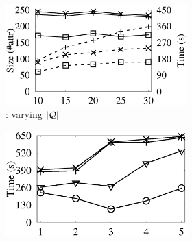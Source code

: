 \begin{figure}[tb!]
  \vspace*{-2.4ex}
  \begin{subfigure}[b]{1.00\textwidth}
    \setlength{\fboxrule}{0.1pt}
    \vspace{0.5ex}
  \end{subfigure}
\begin{subfigure}[b]{1.00\textwidth}
  \centering
        \begin{subfigure}[b]{0.271\textwidth}
			\centering
			\includegraphics[width=1\textwidth]{fig/vary_q_tpch.eps}
			\begin{center}
				\vspace{-2ex}\caption{\tpch: varying $|\mathcal Q|$}
				\label{tpch-1-varyQ}
			\end{center}
			\vspace{-1ex}
        \end{subfigure}
        \hspace{-3ex}
        \begin{subfigure}[b]{0.256\textwidth}
          \centering
          \includegraphics[width=1\textwidth]{fig/vary_j_tpch.eps}

\end{subfigure}
\end{subfigure}
\end{figure}
